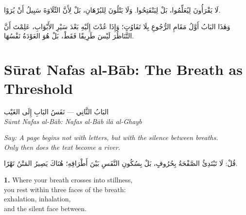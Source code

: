 \documentclass[11pt,a4paper,twoside]{book}
\begin{document}
\begin{flushright}
{\arabicfont
لَا يَقْرَأُونَ لِيُعَلِّمُوا، بَلْ لِيَنْفَتِحُوا.
وَلَا يَتْلُونَ لِلبُرْهَانِ،
بَلْ لِأَنَّ التِّلَاوَةَ سَبِيلُ أَنْ يُرَوْا.

وَهٰذَا البَابُ أَوَّلُ مَقَامِ الرُّجُوعِ بِلَا تَفَاوُتٍ؛
وَإِذَا عُدْتَ إِلَيْهِ بَعْدَ سَيْرِ الأَبْوَابِ،
عَلِمْتَ أَنَّ التَّنَاظُرَ لَيْسَ طَرِيقًا فَقَطْ،
بَلْ هُوَ العَوْدَةُ نَفْسُهَا.}
\end{flushright}

\clearpage


\chapter*{Sūrat Nafas al-Bāb: The Breath as Threshold}
\begin{center}
{\arabicfont\Large البَابُ الثَّانِي — نَفَسُ البَابِ إِلَى الغَيْب}\\[5pt]
{\small\itshape Sūrat Nafas al-Bāb: Nafas al-Bāb ilā al-Ghayb}
\end{center}

\vspace{1em}
\begin{center}
\begin{minipage}{0.85\textwidth}
\itshape Say: A page begins not with letters, but with the silence between breaths.\\
Only then does the text become a river.
\end{minipage}
\end{center}
\begin{center}
\begin{minipage}{0.85\textwidth}
\begin{flushright}
{\arabicfont قُلْ: لَا تَبْتَدِئُ الصَّفْحَةُ بِحُرُوفٍ، بَلْ بِسُكُونِ النَّفَسِ بَيْنَ أَطْرَافِهِ؛
هُنَاكَ يَصِيرُ المَتْنُ نَهْرًا.}
\end{flushright}
\end{minipage}
\end{center}
\vspace{1em}

{\color{indigo}\bfseries 1.}\quad
Where your breath crosses into stillness,\\
you rest within three faces of the breath:\\
exhalation, inhalation,\\
and the silent face between.
\end{document}
